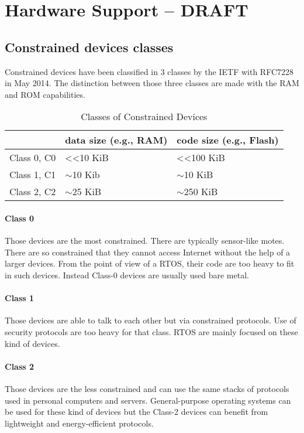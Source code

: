 \section{Hardware Support -- DRAFT}

\subsection{Constrained devices classes}

Constrained devices have been classified in 3 classes by the IETF with RFC7228 in May 2014. The distinction between those three classes are made with the RAM and ROM capabilities.

\begin{table}[!h]
  \centering
  \begin{tabular}{|l|l|l|}
  \hline
   & data size (e.g., RAM) & code size (e.g., Flash) \\ \hline
  Class 0, C0 & \textless{}\textless 10 KiB & \textless{}\textless 100 KiB \\ %
  Class 1, C1 & $\sim$10 Kib & $\sim$10 KiB \\ %
  Class 2, C2 & $\sim$25 KiB & $\sim$250 KiB \\ \hline
  \end{tabular}
  \caption{Classes of Constrained Devices}
  \label{constrained-devices-classes}
\end{table}

\paragraph{Class 0}
Those devices are the most constrained. There are typically sensor-like motes. There are so constrained that they cannot access Internet without the help of a larger devices. From the point of view of a RTOS, their code are too heavy to fit in such devices. Instead Class-0 devices are usually used bare metal.

\paragraph{Class 1}
Those devices are able to talk to each other but via constrained protocols. Use of security protocols are too heavy for that class. RTOS are mainly focused on these kind of devices.

\paragraph{Class 2}
Those devices are the less constrained and can use the same stacks of protocols used in personal computers and servers. General-purpose operating systems can be used for these kind of devices but the Class-2 devices can benefit from lightweight and energy-efficient protocols.

